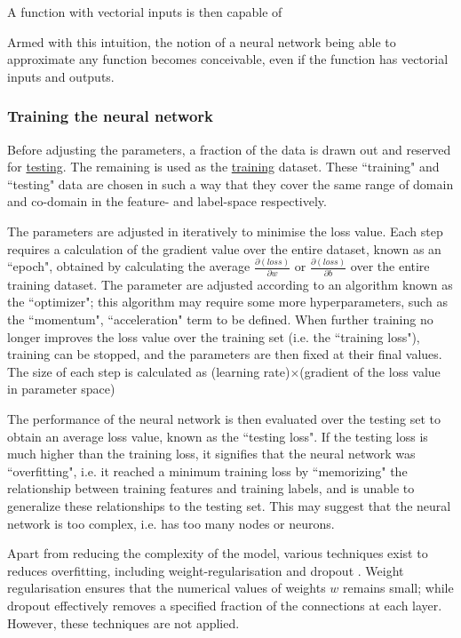 \documentclass[a4paper, 12pt]{article}
\begin{document}
    A function with vectorial inputs is then capable of 

    Armed with this intuition, the notion of a neural network being able to approximate any function becomes conceivable, even if the function has vectorial inputs and outputs.

\subsubsection{Training the neural network}\label{sec:training}
    Before adjusting the parameters, a fraction of the data is drawn out and reserved for \underline{testing}. The remaining is used as the \underline{training} dataset. These ``training" and ``testing" data are chosen in such a way that they cover the same range of domain and co-domain in the feature- and label-space respectively.
    
    The parameters are adjusted in iteratively to minimise the loss value. Each step requires a calculation of the gradient value over the entire dataset, known as an ``epoch", obtained by calculating the average $\frac{\partial (loss)}{\partial w}$ or $\frac{\partial (loss)}{\partial b}$ over the entire training dataset. The parameter are adjusted according to an algorithm known as the ``optimizer"; this algorithm may require some more hyperparameters, such as the ``momentum", ``acceleration" term to be defined. When further training no longer improves the loss value over the training set (i.e. the ``training loss"), training can be stopped, and the parameters are then fixed at their final values. The size of each step is calculated as (learning rate)$\times$(gradient of the loss value in parameter space)

    The performance of the neural network is then evaluated over the testing set to obtain an average loss value, known as the ``testing loss". If the testing loss is much higher than the training loss, it signifies that the neural network was ``overfitting", i.e. it reached a minimum training loss by ``memorizing" the relationship between training features and training labels, and is unable to generalize these relationships to the testing set. This may suggest that the neural network is too complex, i.e. has too many nodes or neurons.

    Apart from reducing the complexity of the model, various techniques exist to reduces overfitting, including weight-regularisation and dropout \cite{TensorFlowOverfitting}. Weight regularisation ensures that the numerical values of weights $w$ remains small; while dropout effectively removes a specified fraction of the connections at each layer. However, these techniques are not applied.
\end{document}
